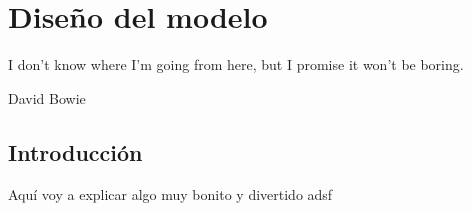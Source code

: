 \chapter{Diseño del modelo}\label{chp-02}
\epigraph{I don't know where I'm going from here, but I promise it won't be boring.}{David Bowie}

\section{Introducción}
Aquí voy a explicar algo muy bonito y divertido  adsf


\endinput